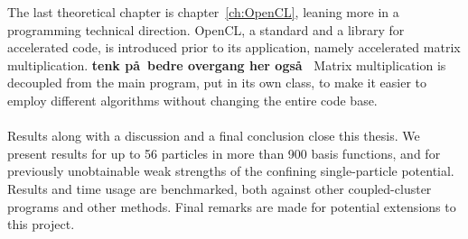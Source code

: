 The last theoretical chapter is chapter~\ref{ch:OpenCL}, leaning more in a programming technical direction.
OpenCL, a standard and a library for accelerated code, is introduced prior to its application, namely accelerated matrix multiplication.
{\bf tenk p\aa\ bedre overgang her ogs\aa\ }
Matrix multiplication is decoupled from the main program, put in its own class, to make it easier to employ different algorithms without changing the entire code base.

\paragraph{}
Results along with a discussion and a final conclusion close this thesis.
We present results for up to 56 particles in more than 900 basis functions, and for previously unobtainable weak strengths of the confining single-particle potential.
Results and time usage are benchmarked, both against other coupled-cluster programs and other methods.
Final remarks are made for potential extensions to this project.

